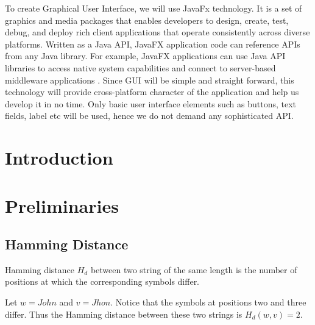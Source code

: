 \documentclass{article}
\begin{document}
To create Graphical User Interface, we will use JavaFx technology. It is a set of graphics and media packages that enables developers to design, create, test, debug, and deploy rich client applications that operate consistently across diverse platforms. Written as a Java API, JavaFX application code can reference APIs from any Java library. For example, JavaFX applications can use Java API libraries to access native system capabilities and connect to server-based middleware applications \cite{javafx_description}. Since GUI will be simple and straight forward, this technology will provide cross-platform character of the application and help us develop it in no time. Only basic user interface elements such as buttons, text fields, label etc will be used, hence we do not demand any sophisticated API.


\section{Introduction}


\newpage




\section{Preliminaries}\label{sec:prelim}



\subsection{Hamming Distance} \label{sec:hamming}

Hamming distance $H_d$ between two string of the same length is the number of positions at which the corresponding symbols differ.

Let $w = John$ and $v = Jhon$. Notice that the symbols at positions two and three differ. Thus the Hamming distance between these two strings is $H_d(w,v) = 2$.

\end{document}

